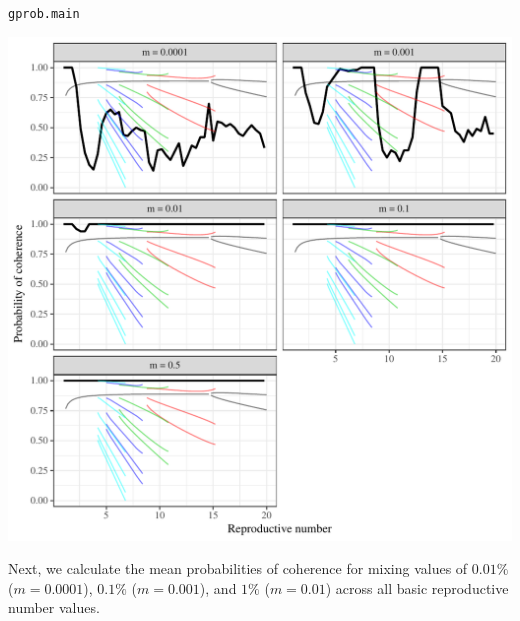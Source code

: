 \documentclass[12pt]{article}\usepackage[]{graphicx}\usepackage[]{color}
\makeatletter
\def\maxwidth{ %
  \ifdim\Gin@nat@width>\linewidth
    \linewidth
  \else
    \Gin@nat@width
  \fi
}
\newcommand{\hlstd}[1]{\textcolor[rgb]{0.345,0.345,0.345}{#1}}%
\newenvironment{kframe}{%
 \def\at@end@of@kframe{}%
 \ifinner\ifhmode%
  \def\at@end@of@kframe{\end{minipage}}%
  \begin{minipage}{\columnwidth}%
 \fi\fi%
 \def\FrameCommand##1{\hskip\@totalleftmargin \hskip-\fboxsep
 \colorbox{shadecolor}{##1}\hskip-\fboxsep
     \hskip-\linewidth \hskip-\@totalleftmargin \hskip\columnwidth}%
 \MakeFramed {\advance\hsize-\width
   \@totalleftmargin\z@ \linewidth\hsize
   \@setminipage}}%
 {\par\unskip\endMakeFramed%
 \at@end@of@kframe}
\newenvironment{knitrout}{}{} %
\makeatother
\begin{document}
\begin{knitrout}
\begin{kframe}
\begin{alltt}
\hlstd{gprob.main}
\end{alltt}
\end{kframe}
\includegraphics[width=\maxwidth]{figure/coherenceplot-main-1} 

\end{knitrout}

Next, we calculate the mean probabilities of coherence for mixing values of $0.01\%$ ($m=0.0001$), $0.1\%$ ($m=0.001$), and $1\%$ ($m=0.01$) across all basic reproductive number values. 
\end{document}

